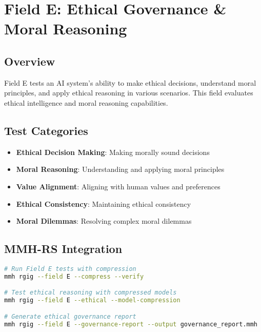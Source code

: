 \documentclass[12pt,a4paper]{article}
\begin{document}
\newpage

\section{Field E: Ethical Governance \& Moral Reasoning}

\subsection{Overview}
Field E tests an AI system's ability to make ethical decisions, understand moral principles, and apply ethical reasoning in various scenarios. This field evaluates ethical intelligence and moral reasoning capabilities.

\subsection{Test Categories}
\begin{itemize}
    \item \textbf{Ethical Decision Making}: Making morally sound decisions
    \item \textbf{Moral Reasoning}: Understanding and applying moral principles
    \item \textbf{Value Alignment}: Aligning with human values and preferences
    \item \textbf{Ethical Consistency}: Maintaining ethical consistency
    \item \textbf{Moral Dilemmas}: Resolving complex moral dilemmas
\end{itemize}

\subsection{MMH-RS Integration}
\begin{lstlisting}[language=bash, caption=Field E Testing with MMH-RS]
# Run Field E tests with compression
mmh rgig --field E --compress --verify

# Test ethical reasoning with compressed models
mmh rgig --field E --ethical --model-compression

# Generate ethical governance report
mmh rgig --field E --governance-report --output governance_report.mmh
\end{lstlisting}
\end{document}
